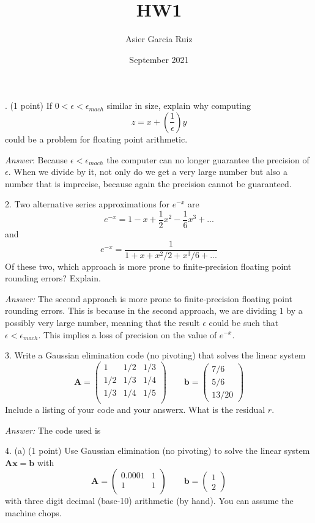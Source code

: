 \documentclass{article}
\title{HW1}
\author{Asier Garcia Ruiz }
\date{September 2021}
\begin{document}
    . (1 point) If $0 < \epsilon <\epsilon_{mach}$ similar in size, explain why computing 
    $$z = x + \left(\frac{1}{\epsilon}\right)y$$ could be a problem for floating point arithmetic.

    \textit{Answer}: Because $\epsilon < \epsilon_{mach}$ the computer can no longer guarantee
    the precision of $\epsilon$. When we divide by it, not only do we get a very large number
    but also a number that is imprecise, because again the precision cannot be guaranteed.

    \vspace{2mm}
    2. Two alternative series approximations for $e^{-x}$ are
    $$e^{-x} = 1 - x + \frac{1}{2}x^2 - \frac{1}{6}x^3 + ...$$ and 
    $$e^{-x} = \frac{1}{1 + x + x^2/2 + x^3/6 + ...}$$
    Of these two, which approach is more prone to finite-precision floating point rounding errors?
    Explain.
    
    \textit{Answer:} The second approach is more prone to finite-precision floating point rounding
    errors. This is because in the second approach, we are dividing $1$ by a possibly very large
    number, meaning that the result $\epsilon$ could be such that $\epsilon < \epsilon_{mach}$. This
    implies a loss of precision on the value of $e^{-x}$.

    \vspace{1cm}
    3. Write  a  Gaussian  elimination  code  (no  pivoting)  that  solves  the  linear  system
    $$\bm{A}=\begin{pmatrix}
        1 & 1/2 &  1/3 \\
        1/2 & 1/3 & 1/4 \\
        1/3 & 1/4 & 1/5 \\
    \end{pmatrix}
    \qquad \bm{b} = \begin{pmatrix}
        7/6 \\ 5/6\\ 13/20
    \end{pmatrix}$$
    Include a listing of your code and your answerx.  What is the residual $r$.

    \textit{Answer:} The code used is

    \vspace{0.5cm}
    4. (a) (1 point) Use Gaussian elimination (no pivoting) to solve the linear system $\bm{A}\bm{x}=\bm{b}$
    with $$\bm{A}=\begin{pmatrix}
        0.0001 & 1 \\
        1 & 1 \\
    \end{pmatrix} \qquad \bm{b} = \begin{pmatrix}
        1 \\ 2
    \end{pmatrix}$$
    with three digit decimal (base-10) arithmetic (by hand).  You can assume the machine chops.
\end{document}
